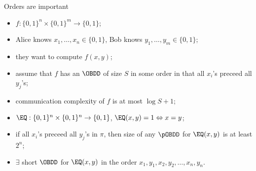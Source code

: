 \begin{frame}{Orders are important}
    \begin{itemize}
        \item $f: \{0, 1\}^n \times \{0, 1\}^m \to \{0, 1\}$;
        \item Alice knows $x_1, \dots, x_n \in \{0, 1\}$, Bob knows $y_1, \dots, y_m \in \{0, 1\}$;
        \item they want to compute $f(x, y)$;
        \pause
        \item assume that $f$ has an $\OBDD$ of size $S$ in some order in that all
            $x_i$'s preceed all $y_j$'s;
        \item communication complexity of $f$ is at most $\log S + 1$;
        \pause
        \item $\EQ: \{0, 1\}^n \times \{0, 1\}^n \to \{0, 1\}$, $\EQ(x, y) = 1 \Leftrightarrow x = y$;
        \item if all $x_i$'s preceed all $y_j$'s in $\pi$, then size of any $\pOBDD$
            for $\EQ(x, y)$ is at least $2^n$;
        \pause
        \item $\exists$ short $\OBDD$ for $\EQ(x, y)$ in the order $x_1, y_1, x_2, y_2, \dots, x_n, y_n$.
    \end{itemize}
\end{frame}